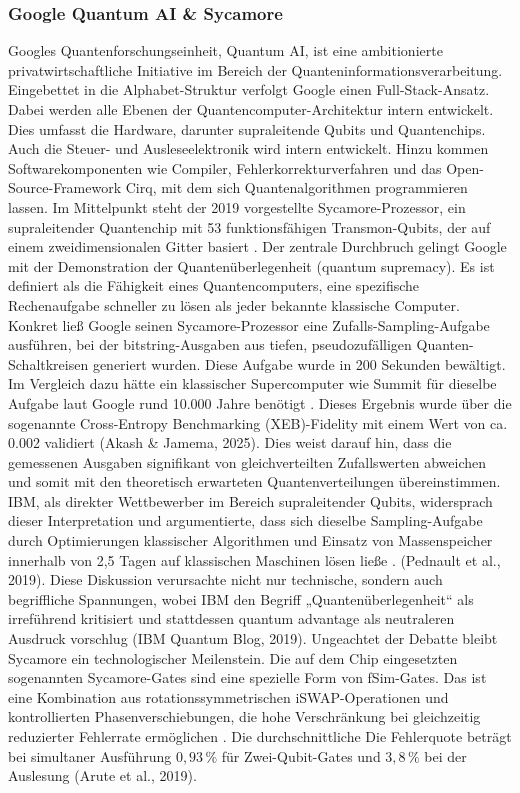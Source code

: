 \subsubsection*{Google Quantum AI & Sycamore} 
Googles Quantenforschungseinheit, Quantum AI, ist eine ambitionierte privatwirtschaftliche Initiative im Bereich der Quanteninformationsverarbeitung.  Eingebettet in die Alphabet-Struktur verfolgt Google einen Full-Stack-Ansatz. Dabei werden alle Ebenen der Quantencomputer-Architektur intern entwickelt. Dies umfasst die Hardware, darunter supraleitende Qubits und Quantenchips. Auch die Steuer- und Ausleseelektronik wird intern entwickelt. Hinzu kommen Softwarekomponenten wie Compiler, Fehlerkorrekturverfahren und das Open-Source-Framework Cirq, mit dem sich Quantenalgorithmen programmieren lassen. Im Mittelpunkt steht der 2019 vorgestellte Sycamore-Prozessor, ein supraleitender Quantenchip mit 53 funktionsfähigen Transmon-Qubits, der auf einem zweidimensionalen Gitter basiert \cite{aruteQuantumSupremacyUsing2019a}.
Der zentrale Durchbruch gelingt Google mit der Demonstration der Quantenüberlegenheit (quantum supremacy). Es ist definiert als die Fähigkeit eines Quantencomputers, eine spezifische Rechenaufgabe schneller zu lösen als jeder bekannte klassische Computer. Konkret ließ Google seinen Sycamore-Prozessor eine Zufalls-Sampling-Aufgabe ausführen, bei der bitstring-Ausgaben aus tiefen, pseudozufälligen Quanten-Schaltkreisen generiert wurden. Diese Aufgabe wurde in 200 Sekunden bewältigt. Im Vergleich dazu hätte ein klassischer Supercomputer wie Summit für dieselbe Aufgabe laut Google rund 10.000 Jahre benötigt \cite{aruteQuantumSupremacyUsing2019a}. Dieses Ergebnis wurde über die sogenannte Cross-Entropy Benchmarking (XEB)-Fidelity mit einem Wert von ca. 0.002 validiert \cite{}(Akash & Jamema, 2025). Dies weist darauf hin, dass die gemessenen Ausgaben signifikant von gleichverteilten Zufallswerten abweichen und somit mit den theoretisch erwarteten Quantenverteilungen übereinstimmen.
IBM, als direkter Wettbewerber im Bereich supraleitender Qubits, widersprach dieser Interpretation und argumentierte, dass sich dieselbe Sampling-Aufgabe durch Optimierungen klassischer Algorithmen und Einsatz von Massenspeicher innerhalb von 2,5 Tagen auf klassischen Maschinen lösen ließe \cite{}. (Pednault et al., 2019). Diese Diskussion verursachte nicht nur technische, sondern auch begriffliche Spannungen, wobei IBM den Begriff „Quantenüberlegenheit“ als irreführend kritisiert und stattdessen quantum advantage als neutraleren Ausdruck vorschlug (IBM Quantum Blog, 2019). Ungeachtet der Debatte bleibt Sycamore ein technologischer Meilenstein. Die auf dem Chip eingesetzten sogenannten Sycamore-Gates sind eine spezielle Form von fSim-Gates. Das ist eine Kombination aus rotationssymmetrischen iSWAP-Operationen und kontrollierten Phasenverschiebungen, die hohe Verschränkung bei gleichzeitig reduzierter Fehlerrate ermöglichen \cite{abughanemPhotonicQuantumComputers2024}. Die durchschnittliche Die Fehlerquote beträgt bei simultaner Ausführung \(0{,}93\,\%\) für Zwei-Qubit-Gates und \(3{,}8\,\%\) bei der Auslesung \cite{}(Arute et al., 2019).
